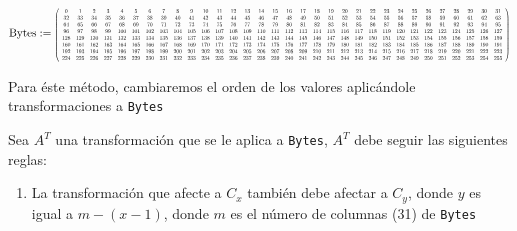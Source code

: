 \documentclass[a4paper]{article}
\newcommand*{\Scale}[2][4]{\scalebox{#1}{$#2$}}%
\begin{document}
\[
\text{Bytes} := \Scale[0.5]{
\left(
\begin{array}{cccccccccccccccccccccccccccccccc}
 0 & 1 & 2 & 3 & 4 & 5 & 6 & 7 & 8 & 9 & 10 & 11 & 12 & 13 & 14 & 15 & 16 & 17
& 18 & 19 & 20 & 21 & 22 & 23 & 24 & 25 & 26 & 27 & 28 & 29 & 30 & 31 \\
 32 & 33 & 34 & 35 & 36 & 37 & 38 & 39 & 40 & 41 & 42 & 43 & 44 & 45 & 46 & 47
& 48 & 49 & 50 & 51 & 52 & 53 & 54 & 55 & 56 & 57 & 58 & 59 & 60 & 61 & 62 & 63
\\
 64 & 65 & 66 & 67 & 68 & 69 & 70 & 71 & 72 & 73 & 74 & 75 & 76 & 77 & 78 & 79
& 80 & 81 & 82 & 83 & 84 & 85 & 86 & 87 & 88 & 89 & 90 & 91 & 92 & 93 & 94 & 95
\\
 96 & 97 & 98 & 99 & 100 & 101 & 102 & 103 & 104 & 105 & 106 & 107 & 108 & 109
& 110 & 111 & 112 & 113 & 114 & 115 & 116 & 117 & 118 & 119 & 120 & 121 & 122 &
123 & 124 & 125 & 126 & 127 \\
 128 & 129 & 130 & 131 & 132 & 133 & 134 & 135 & 136 & 137 & 138 & 139 & 140 &
141 & 142 & 143 & 144 & 145 & 146 & 147 & 148 & 149 & 150 & 151 & 152 & 153 &
154 & 155 & 156 & 157 & 158 & 159 \\
 160 & 161 & 162 & 163 & 164 & 165 & 166 & 167 & 168 & 169 & 170 & 171 & 172 &
173 & 174 & 175 & 176 & 177 & 178 & 179 & 180 & 181 & 182 & 183 & 184 & 185 &
186 & 187 & 188 & 189 & 190 & 191 \\
 192 & 193 & 194 & 195 & 196 & 197 & 198 & 199 & 200 & 201 & 202 & 203 & 204 &
205 & 206 & 207 & 208 & 209 & 210 & 211 & 212 & 213 & 214 & 215 & 216 & 217 &
218 & 219 & 220 & 221 & 222 & 223 \\
 224 & 225 & 226 & 227 & 228 & 229 & 230 & 231 & 232 & 233 & 234 & 235 & 236 &
237 & 238 & 239 & 240 & 241 & 242 & 243 & 244 & 245 & 246 & 247 & 248 & 249 &
250 & 251 & 252 & 253 & 254 & 255 \\
\end{array}
\right)
}
\]

Para éste método, cambiaremos el orden de los valores aplicándole
transformaciones a \texttt{Bytes}

Sea $A^T$ una transformación que se le aplica a \texttt{Bytes}, $A^T$ debe
seguir
las siguientes reglas:

\begin{enumerate}
    \item La transformación que afecte a $C_x$ también debe afectar a $C_y$,
donde $y$ es igual a $m-(x-1)$\label{eq:cond1}, donde $m$ es el número de
columnas (31) de \texttt{Bytes}
\end{enumerate}
\end{document}
